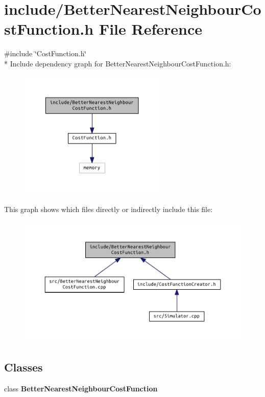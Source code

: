 \section{include/\+Better\+Nearest\+Neighbour\+Cost\+Function.h File Reference}
\label{_better_nearest_neighbour_cost_function_8h}
{\ttfamily \#include \char`\"{}Cost\+Function.\+h\char`\"{}}\\*
Include dependency graph for Better\+Nearest\+Neighbour\+Cost\+Function.\+h\+:\nopagebreak
\begin{figure}[H]
\begin{center}
\leavevmode
\includegraphics[width=199pt]{_better_nearest_neighbour_cost_function_8h__incl}
\end{center}
\end{figure}
This graph shows which files directly or indirectly include this file\+:\nopagebreak
\begin{figure}[H]
\begin{center}
\leavevmode
\includegraphics[width=350pt]{_better_nearest_neighbour_cost_function_8h__dep__incl}
\end{center}
\end{figure}
\subsection*{Classes}
\begin{DoxyCompactItemize}
\item 
class {\bf Better\+Nearest\+Neighbour\+Cost\+Function}
\end{DoxyCompactItemize}
